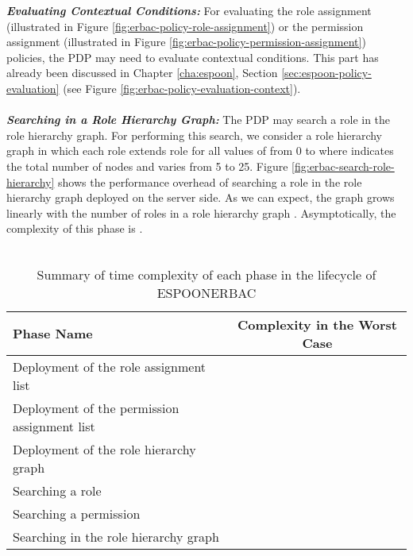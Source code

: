 \documentclass[epsfig,a4paper,11pt,titlepage]{book}
\numberwithin{algorithm}{chapter}
\begin{document}
\noindent \emph{\textbf{Evaluating Contextual Conditions:}}
For evaluating the role assignment (illustrated in Figure \ref{fig:erbac-policy-role-assignment}) or the permission assignment (illustrated in Figure \ref{fig:erbac-policy-permission-assignment}) policies, the \gls{PDP} may need to evaluate contextual conditions. This part has already been discussed in Chapter \ref{cha:espoon}, Section \ref{sec:espoon-policy-evaluation} (see Figure \ref{fig:erbac-policy-evaluation-context}). \\ \\
\noindent \emph{\textbf{Searching in a Role Hierarchy Graph:}}
The \gls{PDP} may search a role in the role hierarchy graph. For performing this search, we consider a role hierarchy graph in which each role  extends role  for all values of  from 0 to  where  indicates the total number of nodes and varies from 5 to 25. Figure \ref{fig:erbac-search-role-hierarchy} shows the performance overhead of searching a role in the role hierarchy graph deployed on the server side. As we can expect, the graph grows linearly with the number of roles in a role hierarchy graph . Asymptotically, the complexity of this phase is . \\ \\


\begin{table} [htp]
\centering
\caption[Time complexity of each phase in the lifecycle of ESPOON]{Summary of time complexity of each phase in the lifecycle of \gls{ESPOONERBAC}}
\label{tab:erbac-complexity-summary}

\begin{tabular}{ |l|c| } 

\hline

\textbf{Phase Name} & \textbf{Complexity in the Worst Case} \\ \hline

Deployment of the role assignment list &  \\ \hline

Deployment of the permission assignment list &  \\ \hline

Deployment of the role hierarchy graph &  \\ \hline

Searching a role &  \\ \hline

Searching a permission &  \\ \hline

Searching in the role hierarchy graph &  \\ \hline

\end{tabular}

\end{table}
\end{document}
